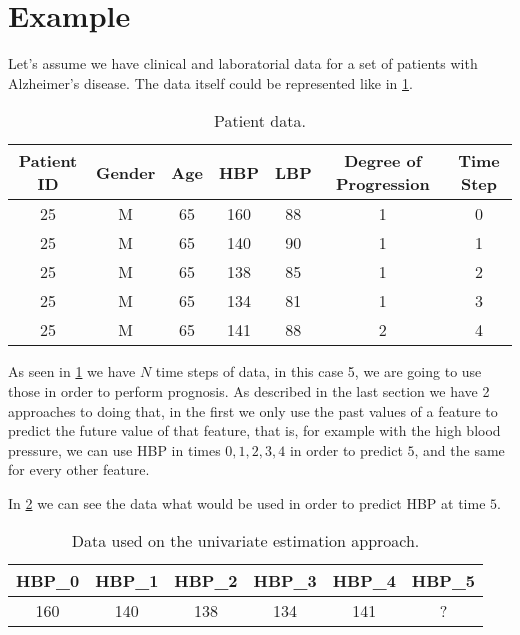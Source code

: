 \section{Example}
\label{section:example}

Let’s assume we have clinical and laboratorial data for a set of patients with Alzheimer’s disease. The data itself could be 
represented like in \ref{tab:diagnostic}. 

\begin{table}[h]
	\begin{center}
		\begin{tabular}{ccccccc}
			\textbf{Patient ID} & \textbf{Gender} & \textbf{Age} & \textbf{HBP} & \textbf{LBP} & \textbf{Degree of Progression} & \textbf{Time Step} \\ \hline
			25         & M      & 65  & 160 & 88  & 1                     & 0         \\
			25         & M      & 65  & 140 & 90  & 1                     & 1         \\
			25         & M      & 65  & 138 & 85  & 1                     & 2         \\
			25         & M      & 65  & 134 & 81  & 1                     & 3         \\
			25         & M      & 65  & 141 & 88  & 2                     & 4         \\ \hline
		\end{tabular}
		\caption{Patient data.}
		\label{tab:diagnostic}
	\end{center}
\end{table}

As seen in \ref{tab:diagnostic} we have $N$ time steps of data, in this case 5, we are going to use those in order to perform prognosis. As described
in the last section we have 2 approaches to doing that, in the first we only use the past values of a feature to predict the future
value of that feature, that is, for example with the high blood pressure, we can use HBP in times $0,1,2,3,4$ in order to predict $5$, and
the same for every other feature.

In \ref{tab:approach1} we can see the data what would be used in order to predict HBP at time $5$.

\begin{table}[h]
	\begin{center}
		\begin{tabular}{cccccc}
			\textbf{HBP\_0} & \textbf{HBP\_1} & \textbf{HBP\_2} & \textbf{HBP\_3} & \textbf{HBP\_4} & \textbf{HBP\_5} \\ \hline
			160             & 140             & 138             & 134             & 141             & ?					\\ \hline        
		\end{tabular}
		\caption{Data used on the univariate estimation approach.}
		\label{tab:approach1}
	\end{center}
\end{table} 

